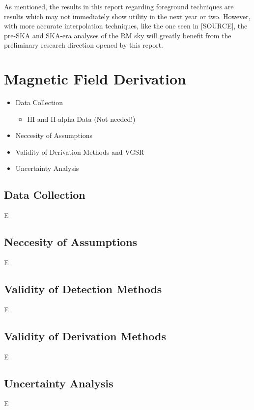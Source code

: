 As mentioned, the results in this report regarding foreground techniques are results which may not immediately show utility in the next year or two. However, with more accurate interpolation techniques, like the one seen in [SOURCE], the pre-SKA and SKA-era analyses of the RM sky will greatly benefit from the preliminary research direction opened by this report.

\section{Magnetic Field Derivation}
\label{sec:mag_disc}

\begin{itemize}
    \item Data Collection
    \begin{itemize}
        \item HI and H-alpha Data (Not needed!)
    \end{itemize}
    \item Neccesity of Assumptions
    \item Validity of Derivation Methods and VGSR
    \item Uncertainty Analysis
\end{itemize}

\subsection{Data Collection}
\label{ssec:B1}

E

\subsection{Neccesity of Assumptions}
\label{ssec:B2}

E

\subsection{Validity of Detection Methods}
\label{ssec:B5}

E

\subsection{Validity of Derivation Methods}
\label{ssec:B3}

E

\subsection{Uncertainty Analysis}
\label{ssec:B4}

E
